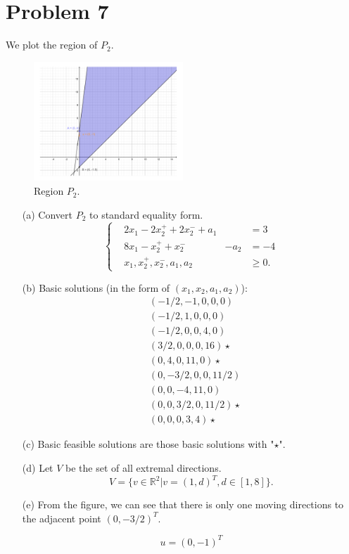 \documentclass[12pt]{article}
\begin{document}
\section*{Problem 7}

We plot the region of $P_2$.

\begin{figure}[htbp]
  \caption{Region $P_2$.}
  \centering
    \includegraphics[width=0.5\textwidth]{p7.pdf}
\end{figure}

\FloatBarrier

\begin{enumerate}
\item [(a)]
Convert $P_2$ to standard equality form.
$$
\left\{
\begin{aligned}
& 2x_1 - 2x_2^+ + 2x_2^- + a_1 & & = 3 \\
& 8x_1 - x_2^+ + x_2^-   & -a_2 & = -4 \\
& x_1, x_2^+, x_2^-, a_1, a_2 & & \geqslant 0.
\end{aligned}
\right.
$$

\item[(b)]
Basic solutions (in the form of $(x_1, x_2, a_1, a_2)$): 
$$
\begin{aligned}
&(-1/2, -1, 0, 0, 0)   \\ 
&(-1/2, 1, 0, 0, 0) \\ 
&(-1/2, 0, 0, 4, 0) \\
& (3/2, 0, 0, 0, 16) \star \\ 
 &(0, 4, 0, 11, 0) \star \\
 & (0, -3/2, 0, 0, 11/2) \\
 & (0, 0, -4, 11, 0) \\
& (0, 0, 3/2, 0, 11/2) \star \\
& (0, 0, 0, 3, 4) \star
\end{aligned}
$$

\item[(c)]
Basic feasible solutions are those basic solutions with "$\star$".

\item[(d)]
Let $V$ be the set of all extremal directions. 
$$
V = \{v \in\mathbb R^2| v = (1, d)^T, d\in [1, 8] \}.
$$

\item[(e)]
From the figure, we can see that there is only one moving directions to the adjacent point $(0, -3/2)^T$. 

$$
u = (0, -1)^T
$$
\end{enumerate}
\end{document}
